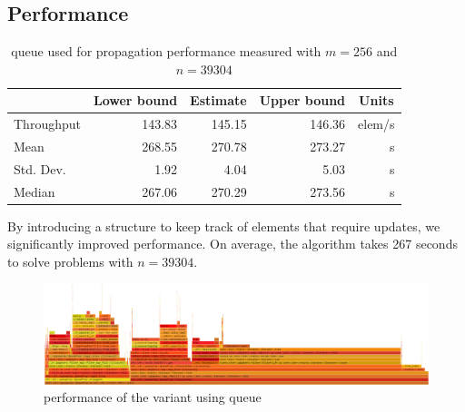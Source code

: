 \documentclass[shortabstract, english, inz]{iithesis}
\begin{document}
\subsection{Performance}
\begin{table}[]
\centering
\begin{tabular}{@{}l|r|r|r|r|@{}}
\cmidrule(l){2-5}
                                 & \multicolumn{1}{c|}{Lower bound} & \multicolumn{1}{c|}{Estimate} & \multicolumn{1}{c|}{Upper bound} & \multicolumn{1}{c|}{Units} \\ \midrule
\multicolumn{1}{|l|}{Throughput} & 143.83                           & 145.15                        & 146.36                           & elem/s                     \\ \midrule
\multicolumn{1}{|l|}{Mean}       & 268.55                           & 270.78                        & 273.27                           & s                          \\ \midrule
\multicolumn{1}{|l|}{Std. Dev.}  & 1.92                             & 4.04                          & 5.03                             & s                          \\ \midrule
\multicolumn{1}{|l|}{Median}     & 267.06                           & 270.29                        & 273.56                           & s                          \\ \bottomrule
\end{tabular}
\caption{queue used for propagation performance measured with \(m=256\) and \(n=39304\)}
\label{table:queue}
\end{table}

By introducing a structure to keep track of elements that require updates, we significantly improved performance. On average, the algorithm takes 267 seconds to solve problems with \(n=39304\).

\begin{figure}[H]
\centering
\includegraphics[width=1\textwidth, angle=0]{images/queueprop_flamegraph.png}
\caption{performance of the variant using queue}
\label{fig:queueprop_flamegraph}
\end{figure}
\end{document}
